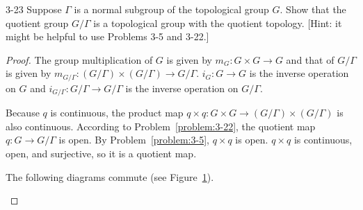 \begin{problem}{3-23}
Suppose $\Gamma$ is a normal subgroup of the topological group $G$. Show that the quotient group $G/\Gamma$ is a topological group with the quotient topology. [Hint: it might be helpful to use Problems 3-5 and 3-22.]
\end{problem}

\begin{proof}
    The group multiplication of $G$ is given by $m_{G}: G\times G\to G$ and that of $G/\Gamma$ is given by $m_{G/\Gamma}: (G/\Gamma)\times (G/\Gamma) \to G/\Gamma$. $i_{G}: G\to G$ is the inverse operation on $G$ and $i_{G/\Gamma}: G/\Gamma \to G/\Gamma$ is the inverse operation on $G/\Gamma$.

    Because $q$ is continuous, the product map $q\times q: G\times G \to (G/\Gamma)\times (G/\Gamma)$ is also continuous. According to Problem~\ref{problem:3-22}, the quotient map $q: G \to G/\Gamma$ is open. By Problem~\ref{problem:3-5}, $q\times q$ is open. $q\times q$ is continuous, open, and surjective, so it is a quotient map.

    The following diagrams commute (see Figure~\ref{fig:3-22}).
    \begin{figure}[htp]
        \centering
        \renewcommand{\thefigure}{3-22}
        \qquad
        \caption{}\label{fig:3-22}
    \end{figure}


\end{proof}
